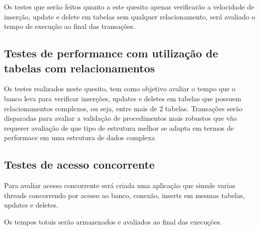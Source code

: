 Os testes que serão feitos quanto a este quesito apenas verificarão a velocidade de inserção, update e delete em tabelas sem qualquer relacionamento, será avaliado o tempo de execução ao final das transações.


\subsection{Testes de performance com utilização de tabelas com relacionamentos}
\label{cha:perfrela}


Os testes realizados neste quesito, tem como objetivo avaliar o tempo que o banco leva para verificar inserções, updates e deletes em tabelas que possuem relacionamentos complexos, ou seja, entre mais de 2 tabelas. Transações serão disparadas para avaliar a validação de procedimentos mais robustos que vão requerer avaliação de que tipo de estrutura melhor se adapta em termos de performace em uma estrutura de dados complexa


\subsection{Testes de acesso concorrente}
\label{cha:con correncia}


Para avaliar acesso concorrente será criada uma aplicação que simule varias threads concorrendo por acesso ao banco, conexão, inserts em mesmas tabelas, updates e deletes.

Os tempos totais serão armazenados e avaliados ao final das execuções.



